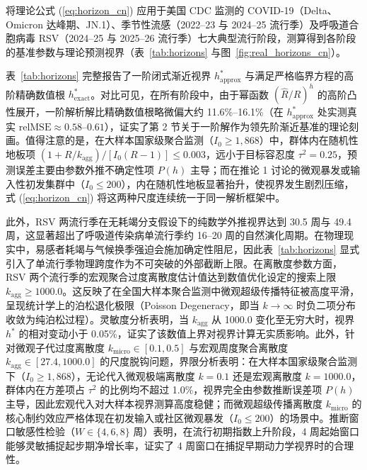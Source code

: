 \documentclass[11pt,a4paper]{article}
\theoremstyle{plain}
\theoremstyle{definition}
\begin{document}
将理论公式 (\ref{eq:horizon_cn}) 应用于美国 CDC 监测的 COVID-19（Delta、Omicron 达峰期、JN.1）、季节性流感（2022--23 与 2024--25 流行季）及呼吸道合胞病毒 RSV（2024--25 与 2025--26 流行季）七大典型流行阶段，测算得到各阶段的基准参数与理论预测视界（表~\ref{tab:horizons} 与图~\ref{fig:real_horizons_cn}）。

表~\ref{tab:horizons} 完整报告了一阶闭式渐近视界 $h^*_{\text{approx}}$ 与满足严格临界方程的高阶精确数值根 $h^*_{\text{exact}}$。对比可见，在所有阶段中，由于幂函数 $(\hat{R}/R)^h$ 的高阶凸性展开，一阶解析解比精确数值根略微偏大约 11.6\%--16.1\%（在 $h^*_{\text{approx}}$ 处实测真实 $\text{relMSE} \approx 0.58\text{--}0.61$），证实了第 2 节关于一阶解作为领先阶渐近基准的理论刻画。值得注意的是，在大样本国家级聚合监测（$I_0 \ge 1,868$）中，群体内在随机性地板项 $(1+R/k_{\text{agg}})/[I_0(R-1)] \le 0.003$，远小于目标容忍度 $\tau^2 = 0.25$，预测误差主要由参数外推不确定性项 $P(h)$ 主导；而在推论 1 讨论的微观暴发或输入性初发集群中（$I_0 \le 200$），内在随机性地板显著抬升，使视界发生剧烈压缩，式 (\ref{eq:horizon_cn}) 将这两种尺度连续统一于同一解析框架中。

此外，RSV 两流行季在无耗竭分支假设下的纯数学外推视界达到 30.5 周与 49.4 周，这显著超出了呼吸道传染病单流行季约 16--20 周的自然演化周期。在物理现实中，易感者耗竭与气候换季强迫会施加确定性阻尼，因此表~\ref{tab:horizons} 显式引入了单流行季物理跨度作为不可突破的外部截断上限。在离散度参数方面，RSV 两个流行季的宏观聚合过度离散度估计值达到数值优化设定的搜索上限 $k_{\text{agg}} \ge 1000.0$。这反映了在全国大样本聚合监测中微观超级传播特征被高度平滑，呈现统计学上的泊松退化极限（Poisson Degeneracy，即当 $k \to \infty$ 时负二项分布收敛为纯泊松过程）。灵敏度分析表明，当 $k_{\text{agg}}$ 从 1000.0 变化至无穷大时，视界 $h^*$ 的相对变动小于 0.05\%，证实了该数值上界对视界计算无实质影响。此外，针对微观子代过度离散度 $k_{\text{micro}} \in [0.1, 0.5]$ 与宏观周度聚合离散度 $k_{\text{agg}} \in [27.4, 1000.0]$ 的尺度脱钩问题，界限分析表明：在大样本国家级聚合监测下（$I_0 \ge 1,868$），无论代入微观极端离散度 $k=0.1$ 还是宏观离散度 $k=1000.0$，群体内在方差项占 $\tau^2$ 的比例均不超过 1.0\%，视界完全由参数推断误差项 $P(h)$ 主导，因此宏观代入对大样本视界测算高度稳健；而微观超级传播离散度 $k_{\text{micro}}$ 的核心制约效应严格体现在初发输入或社区微观暴发（$I_0 \le 200$）的场景中。推断窗口敏感性检验（$W \in \{4, 6, 8\}$ 周）表明，在流行初期指数上升阶段，4 周起始窗口能够灵敏捕捉起步期净增长率，证实了 4 周窗口在捕捉早期动力学视界时的合理性。
\end{document}
